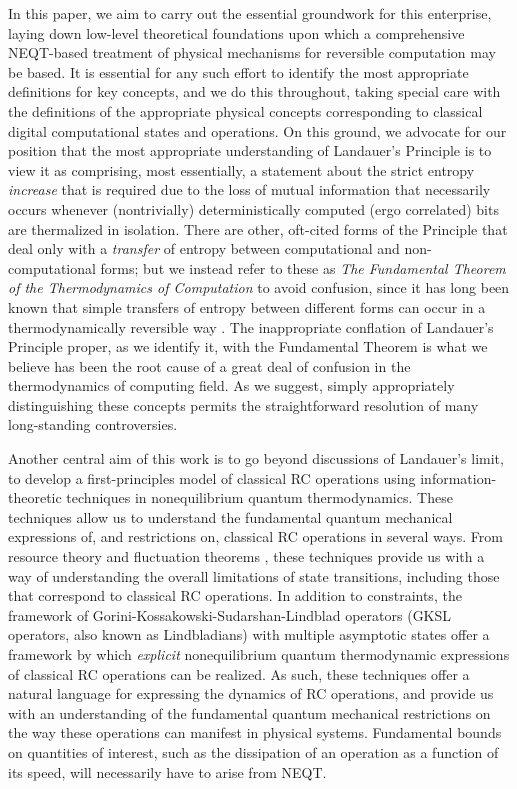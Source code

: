 \documentclass[preprints,article,accept,moreauthors,pdftex]{Definitions/mdpi}
\begin{document}
In this paper, we aim to carry out the essential groundwork for this enterprise, laying down low-level theoretical foundations upon which a comprehensive NEQT-based treatment of physical mechanisms for reversible computation may be based. It is essential for any such effort to identify the most appropriate definitions for key concepts, and we do this throughout, taking special care with the definitions of the appropriate physical concepts corresponding to classical digital computational states and operations. On this ground, we advocate for our position that the most appropriate understanding of Landauer's Principle is to view it as comprising, most essentially, a statement about the strict entropy {\em increase} that is required due to the loss of mutual information that necessarily occurs whenever (nontrivially) deterministically computed (ergo correlated) bits are thermalized in isolation. There are other, oft-cited forms of the Principle that deal only with a {\em transfer} of entropy between computational and non-computational forms; but we instead refer to these as {\em The Fundamental Theorem of the Thermodynamics of Computation} to avoid confusion, since it has long been known that simple transfers of entropy between different forms can occur in a thermodynamically reversible way \cite{Ben03}. The inappropriate conflation of Landauer's Principle proper, as we identify it, with the Fundamental Theorem is what we believe has been the root cause of a great deal of confusion in the thermodynamics of computing field. As we suggest, simply appropriately distinguishing these concepts permits the straightforward resolution of many long-standing controversies.

Another central aim of this work is to go beyond discussions of Landauer's limit, to develop a first-principles model of classical RC operations using information-theoretic techniques in nonequilibrium quantum thermodynamics. These techniques allow us to understand the fundamental quantum mechanical expressions of, and restrictions on, classical RC operations in several ways. From resource theory and fluctuation theorems \cite{Mueller18,FUS18}, these techniques provide us with a way of understanding the overall limitations of state transitions, including those that correspond to classical RC operations. In addition to constraints, the framework of Gorini-Kossakowski-Sudarshan-Lindblad operators (GKSL operators, also known as Lindbladians) with multiple asymptotic states \cite{Albert14,ABFJ16,Albert18} offer a framework by which \emph{explicit} nonequilibrium quantum thermodynamic expressions of classical RC operations can be realized. As such, these techniques offer a natural language for expressing the dynamics of RC operations, and provide us with an understanding of the fundamental quantum mechanical restrictions on the way these operations can manifest in physical systems. Fundamental bounds on quantities of interest, such as the dissipation of an operation as a function of its speed, will necessarily have to arise from NEQT.
\end{document}
